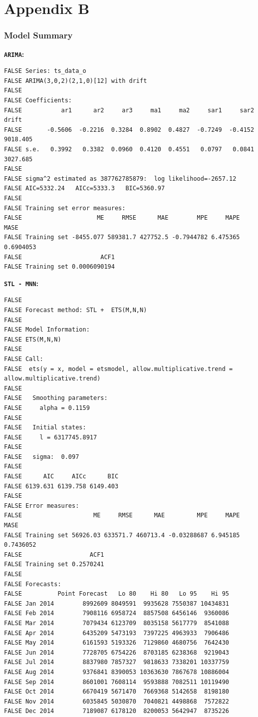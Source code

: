 \documentclass[openany]{book}
\begin{document}
\hypertarget{appendix-b}{%
\chapter*{Appendix B}\label{appendix-b}}

\hypertarget{model-b}{%
\subsection*{Model Summary}\label{model-b}}

\textbf{\texttt{ARIMA}:}

\begin{verbatim}
FALSE Series: ts_data_o 
FALSE ARIMA(3,0,2)(2,1,0)[12] with drift 
FALSE 
FALSE Coefficients:
FALSE           ar1      ar2     ar3     ma1     ma2     sar1     sar2     drift
FALSE       -0.5606  -0.2216  0.3284  0.8902  0.4827  -0.7249  -0.4152  9018.405
FALSE s.e.   0.3992   0.3382  0.0960  0.4120  0.4551   0.0797   0.0841  3027.685
FALSE 
FALSE sigma^2 estimated as 387762785879:  log likelihood=-2657.12
FALSE AIC=5332.24   AICc=5333.3   BIC=5360.97
FALSE 
FALSE Training set error measures:
FALSE                     ME     RMSE      MAE        MPE     MAPE      MASE
FALSE Training set -8455.077 589381.7 427752.5 -0.7944782 6.475365 0.6904053
FALSE                      ACF1
FALSE Training set 0.0006090194
\end{verbatim}

\textbf{\texttt{STL\ -\ MNN}:}

\begin{verbatim}
FALSE 
FALSE Forecast method: STL +  ETS(M,N,N)
FALSE 
FALSE Model Information:
FALSE ETS(M,N,N) 
FALSE 
FALSE Call:
FALSE  ets(y = x, model = etsmodel, allow.multiplicative.trend = allow.multiplicative.trend) 
FALSE 
FALSE   Smoothing parameters:
FALSE     alpha = 0.1159 
FALSE 
FALSE   Initial states:
FALSE     l = 6317745.8917 
FALSE 
FALSE   sigma:  0.097
FALSE 
FALSE      AIC     AICc      BIC 
FALSE 6139.631 6139.758 6149.403 
FALSE 
FALSE Error measures:
FALSE                    ME     RMSE      MAE         MPE     MAPE      MASE
FALSE Training set 56926.03 633571.7 460713.4 -0.03288687 6.945185 0.7436052
FALSE                   ACF1
FALSE Training set 0.2570241
FALSE 
FALSE Forecasts:
FALSE          Point Forecast   Lo 80    Hi 80   Lo 95    Hi 95
FALSE Jan 2014        8992609 8049591  9935628 7550387 10434831
FALSE Feb 2014        7908116 6958724  8857508 6456146  9360086
FALSE Mar 2014        7079434 6123709  8035158 5617779  8541088
FALSE Apr 2014        6435209 5473193  7397225 4963933  7906486
FALSE May 2014        6161593 5193326  7129860 4680756  7642430
FALSE Jun 2014        7728705 6754226  8703185 6238368  9219043
FALSE Jul 2014        8837980 7857327  9818633 7338201 10337759
FALSE Aug 2014        9376841 8390053 10363630 7867678 10886004
FALSE Sep 2014        8601001 7608114  9593888 7082511 10119490
FALSE Oct 2014        6670419 5671470  7669368 5142658  8198180
FALSE Nov 2014        6035845 5030870  7040821 4498868  7572822
FALSE Dec 2014        7189087 6178120  8200053 5642947  8735226
\end{verbatim}
\end{document}
